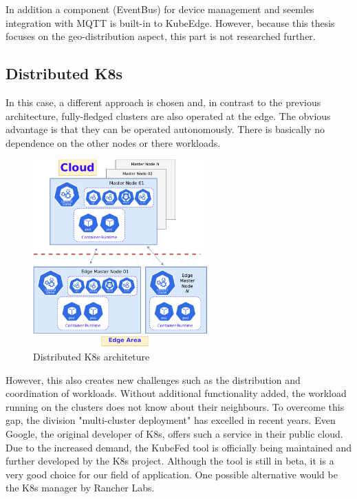\documentclass[MSC,Master,english]{twbook}%
\begin{document}
In addition a component (EventBus) for device management and seemles integration with \ac{MQTT} is built-in to KubeEdge\cite{hal-kubeedge}. However, because this thesis focuses on the geo-distribution aspect, this part is not researched further.


\subsection{Distributed K8s}
\label{sec:disk8s}
In this case, a different approach is chosen and, in contrast to the previous architecture, fully-fledged clusters are also operated at the edge. The obvious advantage is that they can be operated autonomously. There is basically no dependence on the other nodes or there workloads.

\begin{figure}[ht]
    \centering
    \includegraphics[width=0.60\textwidth]{PICs/drawio/distributed-k8s.drawio.pdf}
    \caption{Distributed \ac{K8s} architeture}
    \label{fig:distributed-k8s}
\end{figure}

However, this also creates new challenges such as the distribution and coordination of workloads. Without additional functionality added, the workload running on the clusters does not know about their neighbours. To overcome this gap, the division  "multi-cluster deployment" has excelled in recent years. Even Google, the original developer of \ac{K8s}, offers such a service \cite{google-mcs} in their public cloud. Due to the increased demand, the \ac{KubeFed} tool is officially being maintained and further developed by the \ac{K8s} project\cite{kubefed-github}. Although the tool is still in beta, it is a very good choice for our field of application. One possible alternative would be the \ac{K8s} manager by Rancher Labs.
\end{document}
